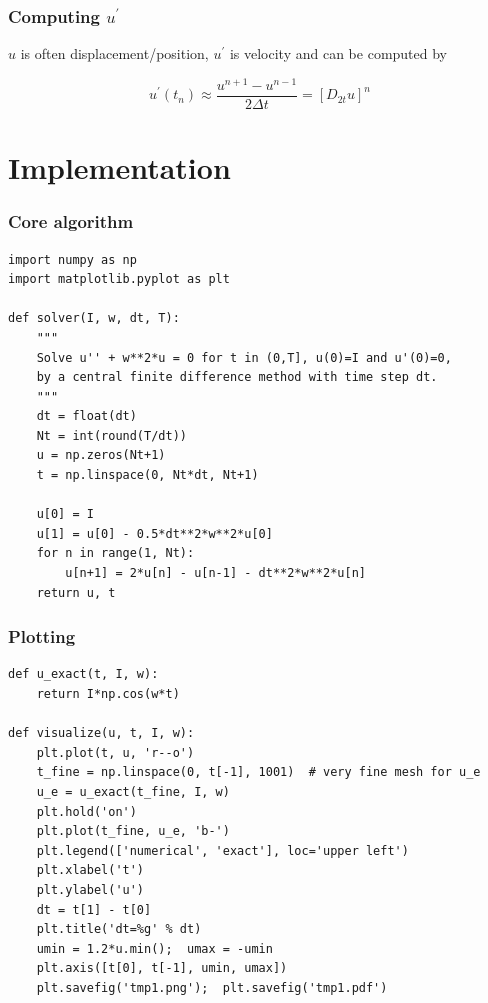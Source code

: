 \documentclass{beamer}
\begin{document}
\begin{frame}
\frametitle{Computing $u^{\prime}$}

$u$ is often displacement/position, $u^{\prime}$ is velocity and can be computed by

\[
u^{\prime}(t_n) \approx \frac{u^{n+1}-u^{n-1}}{2\Delta t} = [D_{2t}u]^n
\]
\end{frame}

\section{Implementation}

\begin{frame}
\frametitle{Core algorithm}

\begin{verbatim}
import numpy as np
import matplotlib.pyplot as plt

def solver(I, w, dt, T):
    """
    Solve u'' + w**2*u = 0 for t in (0,T], u(0)=I and u'(0)=0,
    by a central finite difference method with time step dt.
    """
    dt = float(dt)
    Nt = int(round(T/dt))
    u = np.zeros(Nt+1)
    t = np.linspace(0, Nt*dt, Nt+1)

    u[0] = I
    u[1] = u[0] - 0.5*dt**2*w**2*u[0]
    for n in range(1, Nt):
        u[n+1] = 2*u[n] - u[n-1] - dt**2*w**2*u[n]
    return u, t
\end{verbatim}
\end{frame}

\begin{frame}
\frametitle{Plotting}

\begin{verbatim}
def u_exact(t, I, w):
    return I*np.cos(w*t)

def visualize(u, t, I, w):
    plt.plot(t, u, 'r--o')
    t_fine = np.linspace(0, t[-1], 1001)  # very fine mesh for u_e
    u_e = u_exact(t_fine, I, w)
    plt.hold('on')
    plt.plot(t_fine, u_e, 'b-')
    plt.legend(['numerical', 'exact'], loc='upper left')
    plt.xlabel('t')
    plt.ylabel('u')
    dt = t[1] - t[0]
    plt.title('dt=%g' % dt)
    umin = 1.2*u.min();  umax = -umin
    plt.axis([t[0], t[-1], umin, umax])
    plt.savefig('tmp1.png');  plt.savefig('tmp1.pdf')
\end{verbatim}
\end{frame}
\end{document}
